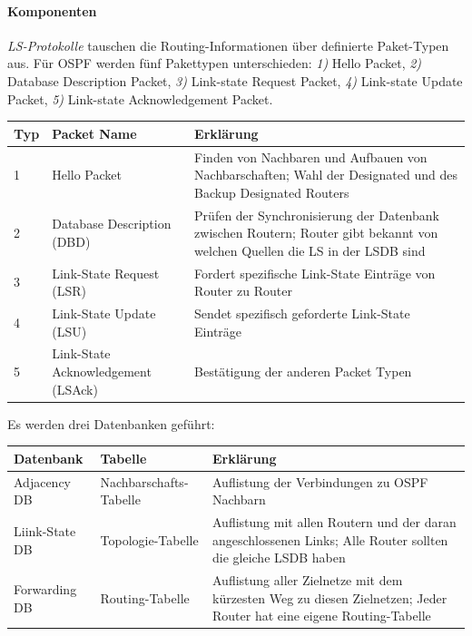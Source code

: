 \documentclass[a4paper,12pt]{article}
\begin{document}
\paragraph{Komponenten}
\emph{LS-Protokolle} tauschen die Routing-Informationen über definierte Paket-Typen aus. Für OSPF werden fünf Pakettypen unterschieden: \emph{1)} Hello Packet, \emph{2)} Database Description Packet, \emph{3)} Link-state Request Packet, \emph{4)} Link-state Update Packet, \emph{5)} Link-state Acknowledgement Packet.\\

\begin{center}
\begin{tabular}{ | m{0.5cm} | m{4cm}| m{5.5cm} | } 
Typ & Packet Name&Erklärung\\ 
\hline
1 & Hello Packet & Finden von Nachbaren und Aufbauen von Nachbarschaften; Wahl der Designated und des Backup Designated Routers\\
2 & Database Description (DBD) & Prüfen der Synchronisierung der Datenbank zwischen Routern; Router gibt bekannt von welchen Quellen die LS in der LSDB sind\\
3 & Link-State Request (LSR) & Fordert spezifische Link-State Einträge von Router zu Router\\
4 & Link-State Update (LSU) & Sendet spezifisch geforderte Link-State Einträge\\
5 & Link-State Acknowledgement (LSAck) & Bestätigung der anderen Packet Typen\\
\end{tabular}
\end{center}


Es werden drei Datenbanken geführt:
\begin{center}
\begin{tabular}{ | m{1.7cm} | m{2.5cm}| m{5.8cm} | } 
Datenbank & Tabelle&Erklärung\\ 
\hline
Adjacency DB & Nachbarschafts-Tabelle & Auflistung der Verbindungen zu OSPF Nachbarn\\
Liink-State DB & Topologie-Tabelle & Auflistung mit allen Routern und der daran angeschlossenen Links; Alle Router sollten die gleiche LSDB haben\\
Forwarding DB & Routing-Tabelle & Auflistung aller Zielnetze mit dem kürzesten Weg zu diesen Zielnetzen; Jeder Router hat eine eigene Routing-Tabelle\\
\end{tabular}
\end{center}
\end{document}
